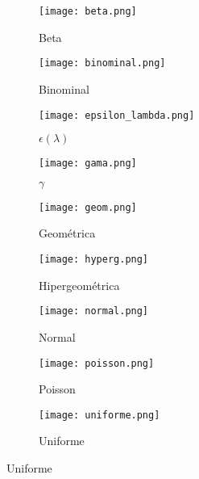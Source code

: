 \begin{figure}[H]
    \begin{subfigure}{.32\textwidth}
        \texttt{[image: beta.png]}
        \caption{Beta}
    \end{subfigure}
    \begin{subfigure}{.32\textwidth}
        \texttt{[image: binominal.png]}
        \caption{Binominal}
    \end{subfigure}
    \begin{subfigure}{.32\textwidth}
        \texttt{[image: epsilon\_lambda.png]}
        \caption{$\epsilon(\lambda)$}
    \end{subfigure}
    \begin{subfigure}{.32\textwidth}
        \texttt{[image: gama.png]}
        \caption{$\gamma$}
    \end{subfigure}
    \begin{subfigure}{.32\textwidth}
        \texttt{[image: geom.png]}
        \caption{Geométrica}
    \end{subfigure}
    \begin{subfigure}{.32\textwidth}
        \texttt{[image: hyperg.png]}
        \caption{Hipergeométrica}
    \end{subfigure}
    \begin{subfigure}{.32\textwidth}
        \texttt{[image: normal.png]}
        \caption{Normal}
    \end{subfigure}
    \begin{subfigure}{.32\textwidth}
        \texttt{[image: poisson.png]}
        \caption{Poisson}
    \end{subfigure}
    \begin{subfigure}{.32\textwidth}
        \texttt{[image: uniforme.png]}
        \caption{Uniforme}
    \end{subfigure}
\end{figure}